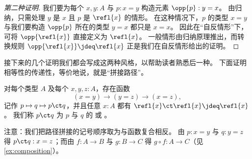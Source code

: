 \begin{proof}[第二种证明]
  我们要为每个 $x,y:A$ 与 $p:x=y$ 构造元素 $\opp{p}:y=x$。
  由归纳，只需处理 $y$ 是 $x$ 且 $p$ 是 $\refl{x}$ 的情形。
  在这种情况下，$p$ 的类型 $x=y$ 与我们要构造 $\opp{p}$ 所在的类型 $y=x$ 都只是 $x=x$。
  因此在“自反情形”下，可将 $\opp{\refl{x}}$ 直接定义为 $\refl{x}$。
  一般情形由归纳原理推出，而转换规则 $\opp{\refl{x}}\jdeq\refl{x}$ 正是我们在自反情形给出的证明。
\end{proof}

接下来的几个证明我们都会写成这两种风格，以帮助读者熟悉后一种。
下面证明相等性的传递性，等价地说，就是“拼接路径”。

\begin{lem}\label{lem:concat}
  对每个类型 $A$ 及每个 $x,y,z:A$，存在函数
  \begin{equation*}
  (x= y) \to   (y= z)\to (x=  z),
  \end{equation*}
  记作 $p \mapsto q \mapsto p\ct q$，并且任意 $x:A$ 都有 $\refl{x}\ct \refl{x}\jdeq \refl{x}$。
  我们称 $p\ct q$ 为 $p$ 与 $q$ 的  或 。
\end{lem}

注意：我们把路径拼接的记号顺序取为与函数复合相反。
由 $p:x=y$ 与 $q:y=z$ 得 $p\ct q : x=z$；而由 $f:A\to B$ 与 $g:B\to C$ 得 $g\circ f : A\to C$（见 \cref{ex:composition}）。

